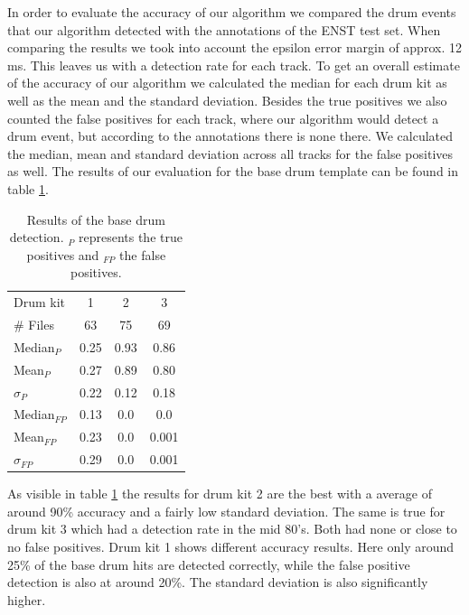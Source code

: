 \documentclass{article}
\begin{document}
In order to evaluate the accuracy of our algorithm we compared the drum events that our algorithm detected with the annotations of the ENST test set.
When comparing the results we took into account the epsilon error margin of approx. 12 ms.
This leaves us with a detection rate for each track.
To get an overall estimate of the accuracy of our algorithm we calculated the median for each drum kit as well as the mean and the standard deviation.
Besides the true positives we also counted the false positives for each track, where our algorithm would detect a drum event, but according to the annotations there is none there.
We calculated the median, mean and standard deviation across all tracks for the false positives as well.
The results of our evaluation for the base drum template can be found in table \ref{tab:results}.


\begin{table}[h]
  \centering
  \begin{tabular}{l | c c c}
      Drum kit  &  1 & 2 & 3 \\
      \# Files &   63 &   75 & 69 \\
      \hline
      Median$_{P}$   & 0.25 & 0.93 & 0.86 \\
      Mean$_{P}$     & 0.27 & 0.89 & 0.80 \\
      $\sigma_P$     & 0.22 & 0.12 & 0.18 \\
      \hline
      Median$_{FP}$   & 0.13 & 0.0 & 0.0 \\
      Mean$_{FP}$     & 0.23 & 0.0 & 0.001 \\
      $\sigma_{FP}$   & 0.29 & 0.0 & 0.001 \\
  \end{tabular}
  \caption{Results of the base drum detection. $_P$ represents the true positives and $_{FP}$ the false positives.}
  \label{tab:results}
\end{table}


As visible in table \ref{tab:results} the results for drum kit 2 are the best with a average of around 90\% accuracy and a fairly low standard deviation.
The same is true for drum kit 3 which had a detection rate in the mid 80's.
Both had none or close to no false positives.
Drum kit 1 shows different accuracy results.
Here only around 25\% of the base drum hits are detected correctly, while the false positive detection is also at around 20\%.
The standard deviation is also significantly higher.
\end{document}
